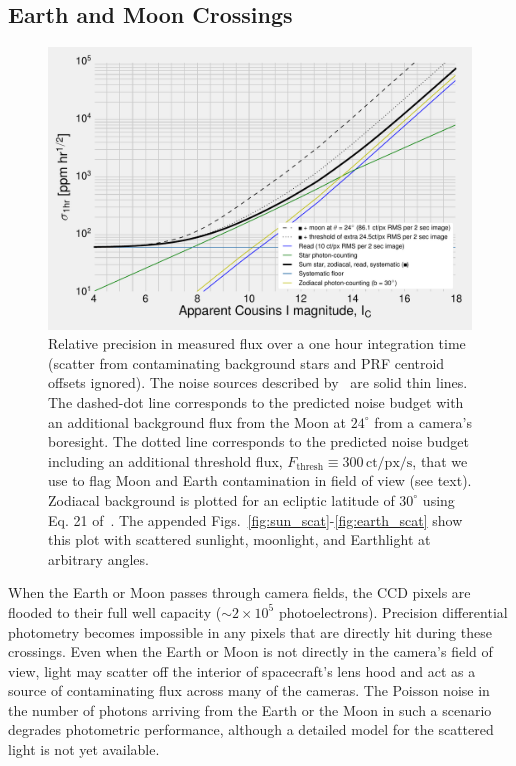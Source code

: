 \subsection{Earth and Moon Crossings}
\label{sec:earth_moon_crossings}
\begin{figure}[!tb]
	\centering
	\includegraphics{figures/precision_memo.pdf}
	\caption{Relative precision in measured flux over a one hour integration 
	time (scatter from contaminating background stars and PRF centroid offsets 
	ignored). The noise sources described by~\protect\citet{Sullivan_2015} are 
	solid thin lines.
	The dashed-dot line corresponds to the predicted noise budget with an 
	additional background flux from the Moon 
	at $24^\circ$ from a camera's boresight.	
	The dotted line corresponds to the predicted noise budget including an 
	additional threshold flux, $F_\mathrm{thresh}\equiv 
	300\,\mathrm{ct/px/s}$, that we use to flag Moon and Earth contamination in 
	\tesss field of view (see text).
	Zodiacal background is plotted for an ecliptic latitude of $30^\circ$ using 
	Eq. 21 of~\protect\citet{Sullivan_2015}.
	The appended Figs.~\protect\ref{fig:sun_scat}-\protect\ref{fig:earth_scat} 
	show this plot with scattered sunlight, moonlight, and Earthlight at 
	arbitrary angles.
	}
	\label{fig:noise_with_moon}
\end{figure}

When the Earth or Moon passes through \tesss camera fields, the CCD
pixels are flooded to their full well capacity ($\sim2\times10^5$
photoelectrons).  Precision differential photometry becomes impossible
in any pixels that are directly hit during these crossings.  Even when
the Earth or Moon is not directly in the camera's field of
view, light may scatter off the interior of spacecraft's lens hood
and act as a source of contaminating flux across many of
the cameras. The Poisson noise in the number of photons
arriving from the Earth or the Moon in such a scenario degrades \tesss
photometric performance, although a detailed model for the scattered light is not yet available.

